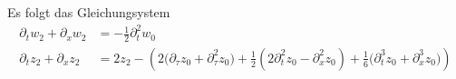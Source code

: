 Es folgt das Gleichungsystem
\begin{align}
\partial_t w_2 + \partial_x w_2 &= - \frac{1}{2} \partial^2_t w_0\\
\partial_t z_2 + \partial_x z_2 &= 2 z_2 - \left( 2 \bigl( \partial_\tau z_0 + \partial^2_\tau z_0 \bigr) + \frac{1}{2} (2\partial^2_t z_0 - \partial^2_x z_0) + \frac{1}{6} \bigl(\partial^3_t z_0 + \partial^3_x z_0\bigr) \right)
\end{align}


